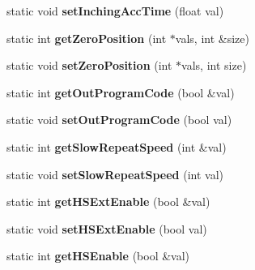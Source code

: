 \begin{DoxyCompactItemize}
\item 
\hypertarget{classRobotConf_afbe29bf62c1193c96275bc3540c1eaba}{static void {\bfseries set\-Inching\-Acc\-Time} (float val)}\label{classRobotConf_afbe29bf62c1193c96275bc3540c1eaba}

\item 
\hypertarget{classRobotConf_a351379aa50a08434522bead59d0a73d6}{static int {\bfseries get\-Zero\-Position} (int $\ast$vals, int \&size)}\label{classRobotConf_a351379aa50a08434522bead59d0a73d6}

\item 
\hypertarget{classRobotConf_a9a6f2a5e94b98190dd48a9fea0ba9d83}{static void {\bfseries set\-Zero\-Position} (int $\ast$vals, int size)}\label{classRobotConf_a9a6f2a5e94b98190dd48a9fea0ba9d83}

\item 
\hypertarget{classRobotConf_ad7fa24d095207dd098f671e1cc92659d}{static int {\bfseries get\-Out\-Program\-Code} (bool \&val)}\label{classRobotConf_ad7fa24d095207dd098f671e1cc92659d}

\item 
\hypertarget{classRobotConf_a89249a88df1855ca0e7275cd9bfd8a8c}{static void {\bfseries set\-Out\-Program\-Code} (bool val)}\label{classRobotConf_a89249a88df1855ca0e7275cd9bfd8a8c}

\item 
\hypertarget{classRobotConf_a321a28d01ffa826cbbfe53c510c42506}{static int {\bfseries get\-Slow\-Repeat\-Speed} (int \&val)}\label{classRobotConf_a321a28d01ffa826cbbfe53c510c42506}

\item 
\hypertarget{classRobotConf_ae214e3447e6f3688f1bd241c56934572}{static void {\bfseries set\-Slow\-Repeat\-Speed} (int val)}\label{classRobotConf_ae214e3447e6f3688f1bd241c56934572}

\item 
\hypertarget{classRobotConf_a9c9db042cbf04624096e278fe19dede3}{static int {\bfseries get\-H\-S\-Ext\-Enable} (bool \&val)}\label{classRobotConf_a9c9db042cbf04624096e278fe19dede3}

\item 
\hypertarget{classRobotConf_ad91b0b66dab751804083b2a3fe6746c1}{static void {\bfseries set\-H\-S\-Ext\-Enable} (bool val)}\label{classRobotConf_ad91b0b66dab751804083b2a3fe6746c1}

\item 
\hypertarget{classRobotConf_a47a3f392300e13a6fc51e4cd1249d6e7}{static int {\bfseries get\-H\-S\-Enable} (bool \&val)}\label{classRobotConf_a47a3f392300e13a6fc51e4cd1249d6e7}


\end{DoxyCompactItemize}
